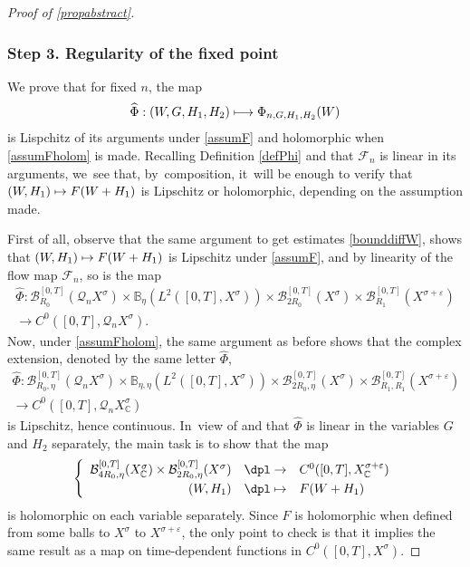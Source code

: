 \documentclass[JEP,XML,SOM,Unicode,published]{cedram}
\newcommand\mto{\mathchoice{\longmapsto}{\mapsto}{\mapsto}{\mapsto}}
\theoremstyle{definition}
\let\mc\mathcal
\let\veps\varepsilon
\newcommand{\B}{\mc{B}}
\newcommand{\Q}{\mathcal{Q}}
\newcommand\FL{\mathcal{F}_{n}}
\begin{document}
\begin{proof}[Proof of \cref{propabstract}]
\subsubsection*{Step 3. Regularity of the fixed point} We prove that for fixed $n$, the map
\[
\widehat{\Phi}: (W, G, H_1, H_2)\mto \Phi_{n, G, H_1, H_2}(W)
\]
is Lispchitz of its arguments under \cref{assumF} and holomorphic when \cref{assumFholom} is made.
Recalling Definition \eqref{defPhi} and that $\FL$ is linear in its arguments, we~see that, by~composition, it~will be enough to verify that $(W,H_1)\mto F(W+H_{1})$ is Lipschitz or holomorphic, depending on the assumption made.

First of all, observe that the same argument to get estimates \eqref{bounddiffW}, shows that $(W,H_1)\mto F(W+H_{1})$ is Lipschitz under \cref{assumF}, and by linearity of the flow map $\mc{F}_n$, so is the map
\begin{multline*}
\widehat{\Phi}: \B_{R_0}^{[0, T]}(\Q_n X^{\sigma})\times \mathbb{B}_{\eta}(L^{2}([0,T],X^{\sigma}))\times \B_{2R_{0}}^{[0,T]}(X^{\sigma}) \times \B_{R_{1}}^{[0,T]}(X^{\sigma+\veps})\\
\to C^0([0, T], \Q_{n }X^{\sigma}).
\end{multline*}
Now, under \cref{assumFholom}, the same argument as before shows that the complex extension, denoted by the same letter $\widehat{\Phi}$,
\begin{multline*}
\widehat{\Phi}: \B_{R_0, \eta}^{[0, T]}(\Q_n X^{\sigma})\times \mathbb{B}_{\eta,\eta}(L^{2}([0,T],X^{\sigma}))\times \B_{2R_{0},\eta}^{[0,T]}(X^{\sigma}) \times \B_{R_{1}, R_{1}}^{[0,T]}(X^{\sigma+\veps})\\ \to C^0([0, T], \Q_{n }X_\mathbb{C}^{\sigma})
\end{multline*}
is Lipschitz, hence continuous. In~view of \cite[Prop.\,8.10]{Muj86} and that $\widehat{\Phi}$ is linear in the variables $G$ and $H_2$ separately, the main task is to show that the map
\begin{align}
\left\{\begin{array}{rcl}
\B_{4R_{0}, \eta}^{[0,T]}(X_{\mathbb{C}}^{\sigma}) \times \B_{2R_{0}, \eta}^{[0,T]}(X^{\sigma}) & \dpl\to& C^0([0, T], X_\mathbb{C}^{\sigma+\veps})\\[3pt]
(W, H_1 )&\dpl\mto& F(W+H_1)
\end{array}\right.
\end{align}
is holomorphic on each variable separately. Since $F$ is holomorphic when defined from some balls to $X^\sigma$ to $X^{\sigma+\veps}$, the only point to check is that it implies the same result as a map on time-dependent functions in $C^0([0,T],X^\sigma)$.


\end{proof}
\end{document}
